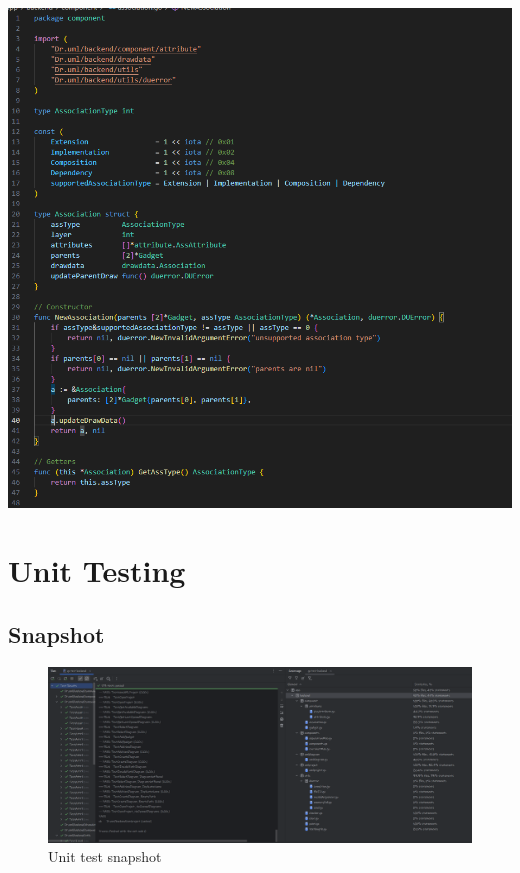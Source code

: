 \documentclass[12pt]{article}
\begin{document}
    \includegraphics[width=0.95\linewidth]
    {assets/hw5/snapshot_association_code}


    \section{Unit Testing}

    \subsection{Snapshot}

    \begin{figure}[H]
        \begin{center}
            \includegraphics[width=0.95\linewidth]
            {assets/hw5/unit_test.png}
            \caption{Unit test snapshot}
        \end{center}
    \end{figure}
\end{document}
